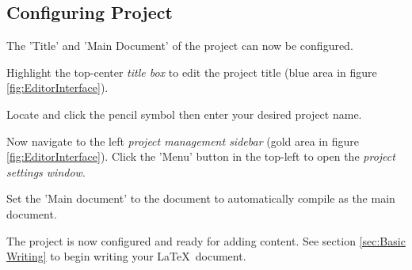 \subsection{Configuring Project}
The 'Title' and 'Main Document' of the project can now be configured.
\par
Highlight the top-center \textit{title box} to edit the project title (blue area in figure \ref{fig:EditorInterface}).

\begin{minipage}{\linewidth}
\end{minipage}

Locate and click the pencil symbol then enter your desired project name.

Now navigate to the left \textit{project management sidebar} (gold area in figure \ref{fig:EditorInterface}). Click the 'Menu' button in the top-left to open the \textit{project  settings window}.

\begin{minipage}{\linewidth}
\centering
{}
\end{minipage}

Set the 'Main document' to the  document to automatically compile  as the main document.
\par
The project is now configured and ready for adding content. See section \ref{sec:Basic Writing} to begin writing your \LaTeX\ document.